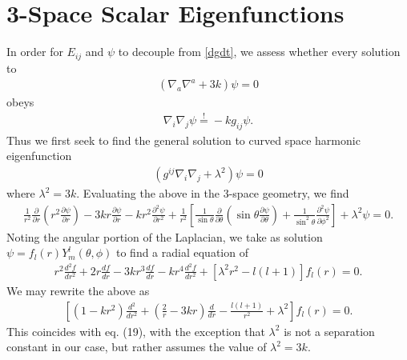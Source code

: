 \documentclass[10pt,letterpaper]{article}
\numberwithin{equation}{section}
\begin{document}
\section{3-Space Scalar Eigenfunctions}
In order for $E_{ij}$ and $\psi$ to decouple from \eqref{dgdt}, we assess whether every solution to
\begin{eqnarray}
(\nabla_a\nabla^a +3k)\psi=0
\end{eqnarray}
obeys
\begin{eqnarray}
\nabla_i \nabla_j \psi \overset{!}{=}-kg_{ij}\psi.
\end{eqnarray}
Thus we first seek to find the general solution to curved space harmonic eigenfunction
\begin{eqnarray}
(g^{ij}\nabla_i \nabla_j +\lambda^2 )\psi=0
\end{eqnarray}
where $\lambda^2 = 3k$. Evaluating the above in the 3-space geometry, we find
\begin{eqnarray}
\frac{1}{r^2}\frac{\partial }{\partial r}\left(r^2\frac{\partial \psi}{\partial r}\right) -3kr \frac{\partial \psi}{\partial r}-kr^2\frac{\partial^2 \psi}{\partial r^2}
+\frac{1}{r^2}\left[ \frac{1}{\sin\theta}\frac{\partial}{\partial \theta}\left(\sin\theta \frac{\partial \psi}{\partial \theta}\right) + \frac{1}{\sin^2\theta}\frac{\partial^2\psi}{\partial \phi^2}\right]+\lambda^2\psi=0.
\end{eqnarray}
Noting the angular portion of the Laplacian, we take as solution $\psi = f_l(r) Y^l_m(\theta,\phi)$ to find a radial equation of 
\begin{eqnarray}
r^2\frac{d^2 f}{dr^2} + 2r\frac{d f}{dr} - 3kr^3 \frac{df}{dr}-kr^4 \frac{d^2 f}{dr^2}+[\lambda^2 r^2-l(l+1)]f_l(r)=0.
\label{radial1}
\end{eqnarray}
We may rewrite the above as
\begin{eqnarray}
\left[ (1-kr^2)\frac{d^2}{dr^2}+ \left(\frac{2}{r}-3kr\right)\frac{d}{dr}-\frac{l(l+1)}{r^2}+\lambda^2 \right]f_l(r)=0.
\label{radial2}
\end{eqnarray}
This coincides with \cite{mannheim1988energy} eq. (19), with the exception that $\lambda^2$ is not a separation constant in our case, but rather assumes the value of $\lambda^2=3k$. 
\\ \\
\end{document}
